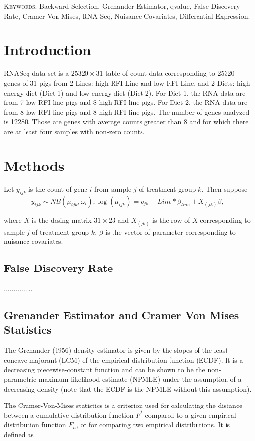 \documentclass[11pt]{article}
\begin{document}
\vspace*{.3in}

\noindent\textsc{Keywords}: {Backward Selection, Grenander Estimator, qvalue, False Discovery Rate, Cramer Von Mises, RNA-Seq, Nuisance Covariates, Differential Expression.}

\newpage

\section{Introduction}
RNASeq data set is a $25320 \times 31$ table of count data corresponding
to 25320 genes of 31 pigs from 2 Lines: high RFI Line and low RFI
Line, and 2 Diets: high energy diet (Diet 1) and low energy diet (Diet
2). For Diet 1, the RNA data are from 7 low RFI line pigs and 8 high RFI
line pigs. For Diet 2, the RNA data are from 8 low RFI line pigs and 8
high RFI line pigs.
The number of genes analyzed is
12280. Those are genes with average counts greater than 8 and for
which there are at least four samples with non-zero counts.

\section{Methods}
Let $y_{ijk}$ is the count of gene $i$ from sample $j$ of treatment group $k$. Then suppose 
\[
y_{ijk} \sim NB(\mu_{ijk}, \omega_i), \log(\mu_{ijk}) = o_{jk} + Line*\beta_{line} + X_{(jk)}\beta,
\]

where $X$ is the desing matrix $31\times 23$ and $X_{(jk)}$ is the row of $X$ 
corresponding to sample $j$ of treatment group $k$, $\beta$ is the vector of parameter corresponding to  nuisance covariates.
\subsection{False Discovery Rate}
...............
\subsection{Grenander Estimator and Cramer Von Mises Statistics}
The Grenander (1956) density estimator is given by the slopes of the least concave majorant (LCM) of the empirical distribution function (ECDF). It is a decreasing piecewise-constant function and can be shown to be the non-parametric maximum likelihood estimate (NPMLE) under the assumption of a decreasing density (note that the ECDF is the NPMLE without this assumption). 

The Cramer-Von-Mises statistics is a criterion used for calculating the distance between  a cumulative distribution function $F^*$ compared to a given empirical distribution function $F_n$, or for comparing two empirical distributions. It is defined as
\end{document}
